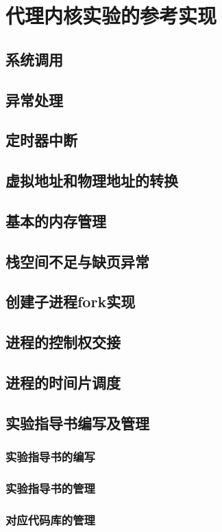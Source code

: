 
\chapter{代理内核实验的参考实现}

\section{系统调用}

\section{异常处理}

\section{定时器中断}

\section{虚拟地址和物理地址的转换}

\section{基本的内存管理}

\section{栈空间不足与缺页异常}

\section{创建子进程fork实现}

\section{进程的控制权交接}

\section{进程的时间片调度}

\section{实验指导书编写及管理}

\subsection{实验指导书的编写}

\subsection{实验指导书的管理}

\subsection{对应代码库的管理}
